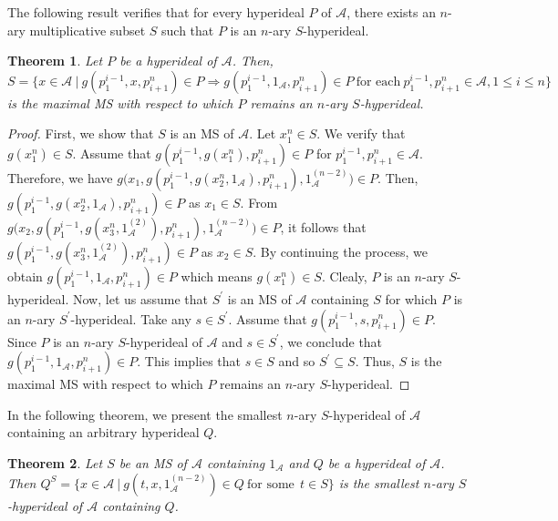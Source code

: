 \documentclass[preprint,review,10pt]{amsart}
\newtheorem{theorem}{Theorem}[section]
\theoremstyle{definition}
\theoremstyle{remark}
\numberwithin{equation}{section}
\begin{document}
The following result verifies that for every hyperideal $P$ of $\mathscr{A}$, there exists an $n$-ary multiplicative  subset $S$ such that $P$ is an $n$-ary $S$-hyperideal.
\begin{theorem} \label{3}
Let $P$ be a hyperideal of $\mathscr{A}$. Then, 
$S=\{x \in \mathscr{A} \ \vert \ g(p_1^{i-1},x,p_{i+1}^n) \in P \Longrightarrow g(p_1^{i-1},1_\mathscr{A},p_{i+1}^n) \in P \ \text{for each} \  p_1^{i-1},p_{i+1}^n \in \mathscr{A}, 1 \leq i \leq n \}$ is the maximal MS with respect to which $P$ remains an $n$-ary $S$-hyperideal.
\end{theorem}
\begin{proof}
First, we show that $S$ is an MS of $\mathscr{A}$. Let $x_1^n \in S$. We verify that $g(x_1^n) \in S$. Assume that $g(p_1^{i-1},g(x_1^n),p_{i+1}^n) \in P$ for $p_1^{i-1},p_{i+1}^n \in \mathscr{A}$. Therefore, we have $g \big(x_1,g(p_1^{i-1},g(x_2^n,1_\mathscr{A}),p_{i+1}^n),1_\mathscr{A}^{(n-2)} \big) \in P$. Then, $g(p_1^{i-1},g(x_2^n,1_\mathscr{A}),p_{i+1}^n) \in P$ as $x_1 \in S$. From $g \big(x_2,g(p_1^{i-1},g(x_3^n,1_\mathscr{A}^{(2)}),p_{i+1}^n ) ,1_\mathscr{A}^{(n-2)} \big)\in P$, it follows that $g(p_1^{i-1},g(x_3^n,1_\mathscr{A}^{(2)}),p_{i+1}^n) \in P$ as $x_2 \in S$. By continuing the process, we obtain $g(p_1^{i-1},1_\mathscr{A},p_{i+1}^n) \in P$ which means $g(x_1^n) \in S$. Clealy, $P$ is an $n$-ary $S$-hyperideal. Now, let us assume that $S^{\prime}$ is an MS of $\mathscr{A}$ containing $S$ for which $P$ is an $n$-ary $S^{\prime}$-hyperideal. Take any $s \in S^{\prime}$. Assume that $g(p_1^{i-1},s,p_{i+1}^n) \in P$. Since $P$ is an $n$-ary $S$-hyperideal of $\mathscr{A}$ and  $s \in S^{\prime}$, we conclude that $g(p_1^{i-1},1_\mathscr{A},p_{i+1}^n) \in P$. This implies that $s \in S$ and so $S^{\prime} \subseteq S$. Thus, $S$ is the maximal MS with respect to which $P$ remains an $n$-ary $S$-hyperideal.
\end{proof}
In the following theorem,  we   present the smallest $n$-ary $S$-hyperideal of $\mathscr{A}$ containing an arbitrary hyperideal $Q$.
\begin{theorem} \label{4}
Let $S$ be an MS of $\mathscr{A}$ containing $1_\mathscr{A}$ and $Q$ be a hyperideal of $\mathscr{A}$. Then $Q^S=\{x \in \mathscr{A} \ \vert \ g(t,x,1_\mathscr{A}^{(n-2)}) \in Q\ \text{for some}  \ \ t \in S\}$   is the smallest $n$-ary $S$-hyperideal of $\mathscr{A}$ containing $Q$.
\end{theorem}
\end{document}
